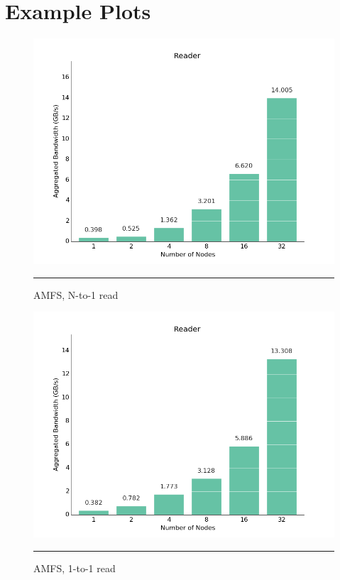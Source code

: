 
\chapter{Example Plots} %

\label{AppendixB} %


\begin{figure}[H]
  \centering
    \includegraphics[scale=0.6]{Figures/amfora_32_n_to_1.png}
    \rule{25em}{0.5pt}
  \caption[AMFS, N-to-1 read]{AMFS, N-to-1 read}
  \label{fig:plot1}
\end{figure}

\begin{figure}[H]
  \centering
    \includegraphics[scale=0.6]{Figures/amfora_32_1_to_1.png}
    \rule{25em}{0.5pt}
  \caption[AMFS, 1-to-1 read]{AMFS, 1-to-1 read}
  \label{fig:plot2}
\end{figure}


